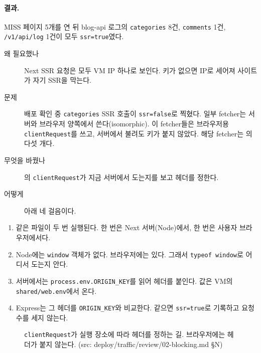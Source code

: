 \paragraph{결과.}
MISS 페이지 5개를 연 뒤 blog-api 로그의 \texttt{categories} 8건, \texttt{comments} 1건, \texttt{/v1/api/log} 1건이 모두 \texttt{ssr=true}였다.

\begin{description}
  \item[왜 필요했나] Next SSR 요청은 모두 VM IP 하나로 보인다.
    키가 없으면 IP로 세어져 사이트가 자기 SSR을 막는다.
  \item[문제] 배포 확인 중 \texttt{categories} SSR 호출이 \texttt{ssr=false}로 찍혔다.
    일부 fetcher는 서버와 브라우저 양쪽에서 쓴다(isomorphic).
    이 fetcher들은 브라우저용 \texttt{clientRequest}를 쓰고, 서버에서 불려도 키가 붙지 않았다.
    해당 fetcher는 의 다섯 개다.
  \item[무엇을 바꿨나] 의 \texttt{clientRequest}가 지금 서버에서 도는지를 보고 헤더를 정한다.
  \item[어떻게]  아래 네 걸음이다.
\end{description}

\begin{enumerate}[nosep]
  \item 같은 파일이 두 번 실행된다. 한 번은 Next 서버(Node)에서, 한 번은 사용자 브라우저에서다.
  \item Node에는 \texttt{window} 객체가 없다. 브라우저에는 있다. 그래서 \texttt{typeof window}로 어디서 도는지 안다.
  \item 서버에서는 \texttt{process.env.ORIGIN\_KEY}를 읽어 헤더를 붙인다. 값은 VM의 \texttt{shared/web.env}에서 온다.
  \item Express는 그 헤더를 \texttt{ORIGIN\_KEY}와 비교한다. 같으면 \texttt{ssr=true}로 기록하고 요청 수를 세지 않는다.
\end{enumerate}

\begin{figure}[H]
  \centering
  \caption{\texttt{clientRequest}가 실행 장소에 따라 헤더를 정하는 길.
  브라우저에는 헤더가 붙지 않는다. (src: deploy/traffic/review/02-blocking.md §N)}\label{fig:05-clientrequest}
\end{figure}

